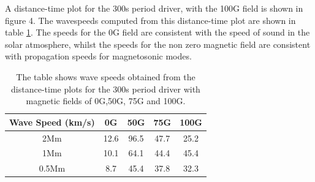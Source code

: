 \documentclass[linenumbers]{aastex63}
\begin{document}



A distance-time plot for the 300s period driver, with the 100G field is shown in figure 4. The wavespeeds computed from this distance-time plot are shown in table \ref{Tablewavespeeds_300s}. The speeds for the 0G field are consistent with the speed of sound in the solar atmosphere, whilst the speeds for the non zero magnetic field are consistent with propagation speeds for magnetosonic modes. 
\begin{table}\label{wavespeeds}
\centering
\begin{tabular}{c c c c c}
\hline
Wave Speed (km/s)   &  0G  &  50G &  75G & 100G\\
\hline
2Mm & 12.6  &   96.5       &   47.7      &  25.2     \\
\hline
1Mm & 10.1  &    64.1      &   44.4     &   45.4      \\
\hline
0.5Mm & 8.7  &   45.4      &   37.8      &   32.3    \\
\hline

\end{tabular} 
\caption{The table shows wave speeds obtained from the distance-time plots for the 300s period driver with magnetic fields of 0G,50G, 75G and 100G.}
\label{Tablewavespeeds_300s}
\end{table}
\end{document}
